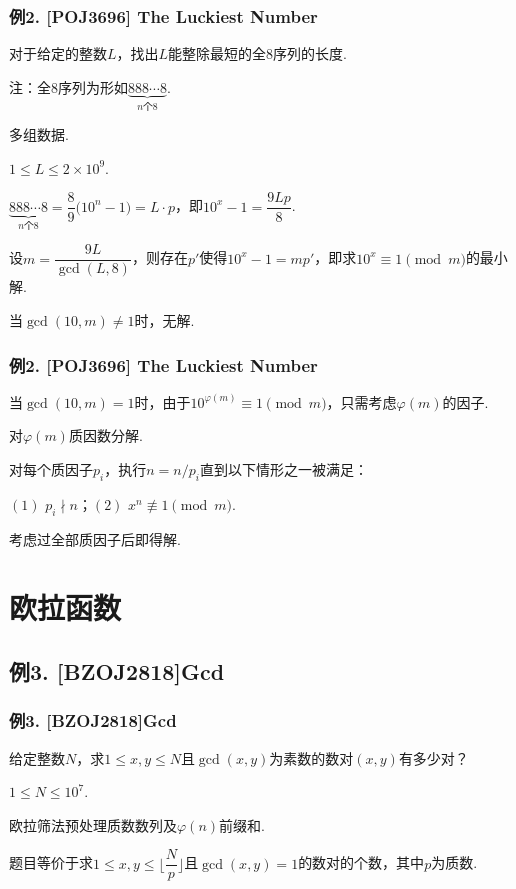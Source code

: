 \documentclass{beamer}
\def\leq{\leqslant}
\def\dou{，\!\!}
\begin{document}
    \begin{frame}
        \frametitle{例2. [POJ3696] The Luckiest Number}
        \begin{block}

            对于给定的整数$L$\dou 找出$L$能整除最短的全8序列的长度.\pause

            注：\!\!全8序列为形如$\underbrace{888\cdots 8}_{n\text{个}8}$.\pause

            多组数据.\pause

            $1\leq L\leq 2\times {10}^9$.\pause
        \end{block}

        $\underbrace{888\cdots 8}_{n\text{个}8}=\dfrac{8}{9}\big({10}^n-1\big)=L\cdot p$\dou 即${10}^x-1=\dfrac{9Lp}{8}$.\pause

        设$m=\dfrac{9L}{\gcd(L,8)}$\dou 则存在$p'$使得${10}^x-1=mp'$\dou 即求${10}^x\equiv 1\pmod{m}$的最小解.\pause

        当$\gcd(10,m)\neq 1$时\dou 无解.
    \end{frame}

    \begin{frame}
        \frametitle{例2. [POJ3696] The Luckiest Number}
        当$\gcd(10,m)=1$时\dou 由于${10}^{\varphi(m)}\equiv 1\pmod{m}$\dou 只需考虑$\varphi(m)$的因子.\pause

        对$\varphi(m)$质因数分解.\pause

        对每个质因子$p_i$\dou 执行$n=n/p_i$直到以下情形之一被满足：
        
        $(1)$ $p_i\nmid n$；\!\!$(2)$ $x^n\not\equiv 1\pmod{m}$.\pause

        考虑过全部质因子后即得解.
    \end{frame}

    \section{欧拉函数}

    \subsection{例3. [BZOJ2818]Gcd}

    \begin{frame}
        \frametitle{例3. [BZOJ2818]Gcd}
        \begin{block}

            给定整数$N$\dou 求$1\leq x,y\leq N$且$\gcd(x,y)$为素数的数对$(x,y)$有多少对？\pause

            $1\leq N\leq {10}^7$.\pause
        \end{block}

        欧拉筛法预处理质数数列及$\varphi(n)$前缀和.\pause

        题目等价于求$1\leq x,y\leq\bigg\lfloor\dfrac{N}{p}\bigg\rfloor$且$\gcd(x,y)=1$的数对的个数\dou 其中$p$为质数.
    \end{frame}
\end{document}
